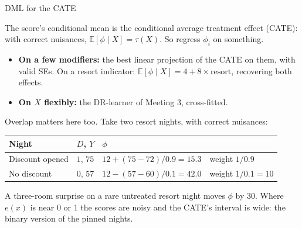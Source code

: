 \documentclass[aspectratio=169, 11pt, handout]{beamer}
\newcommand{\E}{\mathbb{E}}
\begin{document}
\begin{frame}{DML for the CATE}

The score's conditional mean is the conditional average treatment effect (CATE): with correct nuisances, $\E[\phi \mid X] = \tau(X)$. So regress $\phi_i$ on something.

\begin{itemize}
  \item \textbf{On a few modifiers:} the best linear projection of the CATE on them, with valid SEs. On a resort indicator: $\E[\phi \mid X] = 4 + 8 \times \text{resort}$, recovering both effects.
  \item \textbf{On $X$ flexibly:} the DR-learner of Meeting 3, cross-fitted.
\end{itemize}

\bigskip

Overlap matters here too. Take two resort nights, with correct nuisances:
\begin{center}
\small
\begin{tabular}{llll}
\toprule
\textbf{Night} & $D$, $Y$ & $\phi$ & \\
\midrule
Discount opened & $1$, $75$ & $12 + (75 - 72)/0.9 = 15.3$ & weight $1/0.9$ \\
No discount     & $0$, $57$ & $12 - (57 - 60)/0.1 = 42.0$ & weight $1/0.1 = 10$ \\
\bottomrule
\end{tabular}
\end{center}

A three-room surprise on a rare untreated resort night moves $\phi$ by 30. Where $e(x)$ is near 0 or 1 the scores are noisy and the CATE's interval is wide: the binary version of the pinned nights.
\end{frame}
\end{document}
